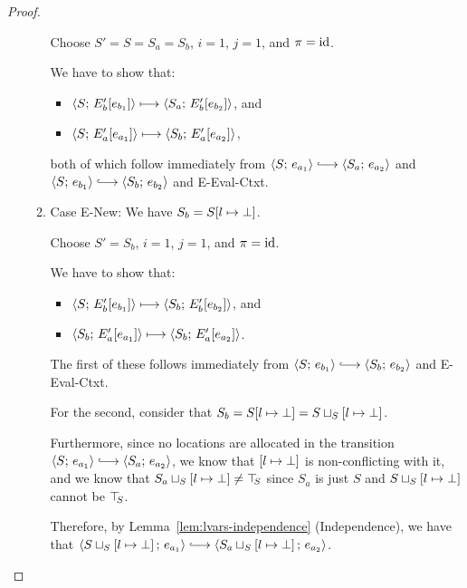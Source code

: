 \begin{proof}
\begin{enumerate}
\begin{enumerate}
      Choose $S' = S = S_a = S_b$, $i = 1$, $j = 1$, and $\pi = \mathrm{id}$.

      We have to show that:
      \begin{itemize}
      \item $\langle S;\, E'_b\hspace{-0.5mm}\left[e_{b_1}\right] \rangle \longmapsto
        \langle S_a;\, E'_b\hspace{-0.5mm}\left[e_{b_2}\right] \rangle$, and
      \item $\langle S;\, E'_a\hspace{-0.5mm}\left[e_{a_1}\right] \rangle \longmapsto
        \langle S_b;\, E'_a\hspace{-0.5mm}\left[e_{a_2}\right] \rangle$, 
      \end{itemize}

      both of which follow immediately from $\config{S}{e_{a_1}}
      \parstepsto \config{S_a}{e_{a_2}}$ and $\config{S}{e_{b_1}}
      \parstepsto \config{S_b}{e_{b_2}}$ and {\sc E-Eval-Ctxt}.

    \item \label{lvars-slc-beta-new}Case {\sc E-New}: We have $S_b =
      S[l \mapsto \bot]$.

      Choose $S' = S_b$, $i = 1$, $j = 1$, and $\pi = \mathrm{id}$.

      We have to show that:
      \begin{itemize}
      \item $\langle S;\, E'_b\hspace{-0.5mm}\left[e_{b_1}\right] \rangle \longmapsto
        \langle S_b;\, E'_b\hspace{-0.5mm}\left[e_{b_2}\right] \rangle$, and
      \item $\langle S_b;\, E'_a\hspace{-0.5mm}\left[e_{a_1}\right] \rangle \longmapsto
        \langle S_b;\, E'_a\hspace{-0.5mm}\left[e_{a_2}\right] \rangle$.
      \end{itemize}

      The first of these follows immediately from $\config{S}{e_{b_1}}
      \parstepsto \config{S_b}{e_{b_2}}$ and {\sc E-Eval-Ctxt}.

      For the second, consider that $S_b = S[l \mapsto \bot] =
      S \sqcup_{S} \left[ l \mapsto \bot \right]$.

      Furthermore, since no locations are allocated in the transition
      $\config{S}{e_{a_1}} \parstepsto \config{S_a}{e_{a_2}}$, we know
      that $\left[ l \mapsto \bot \right]$ is non-conflicting with
      it, and we know that
      $S_a \sqcup_{S} \left[ l \mapsto \bot \right] \neq \top\hspace{-0.85mm}_{S}$
      since $S_a$ is just $S$ and
      $S \sqcup_{S} \left[ l \mapsto \bot \right]$ cannot be
      $\top\hspace{-0.85mm}_{S}$.

      Therefore, by Lemma~\ref{lem:lvars-independence} (Independence),
      we have that
      $\config{\lubstore{S}{\store{\storebindingRaw{l}{\bot}}}}{e_{a_1}}
      \parstepsto
      \config{\lubstore{S_a}{\store{\storebindingRaw{l}{\bot}}}}{e_{a_2}}$.


\end{enumerate}
\end{enumerate}
\end{proof}
